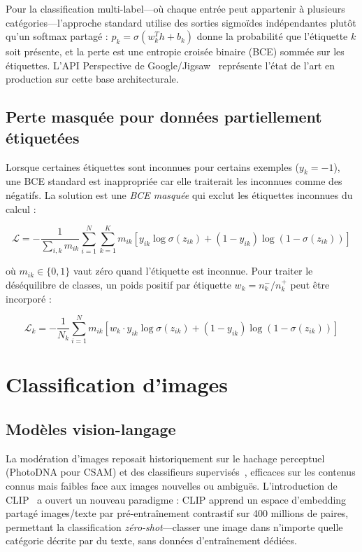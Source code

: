 Pour la classification multi-label---où chaque entrée peut appartenir à plusieurs catégories---l'approche standard utilise des sorties sigmoïdes indépendantes plutôt qu'un softmax partagé : $p_k = \sigma(w_k^T h + b_k)$ donne la probabilité que l'étiquette $k$ soit présente, et la perte est une entropie croisée binaire (BCE) sommée sur les étiquettes. L'API Perspective de Google/Jigsaw~\cite{perspective2023api} représente l'état de l'art en production sur cette base architecturale.

\subsection{Perte masquée pour données partiellement étiquetées}

Lorsque certaines étiquettes sont inconnues pour certains exemples ($y_k = -1$), une BCE standard est inappropriée car elle traiterait les inconnues comme des négatifs. La solution est une \emph{BCE masquée} qui exclut les étiquettes inconnues du calcul :

\begin{equation}
\mathcal{L} = -\frac{1}{\sum_{i,k} m_{ik}} \sum_{i=1}^{N} \sum_{k=1}^{K} m_{ik} \left[ y_{ik} \log \sigma(z_{ik}) + (1 - y_{ik}) \log (1 - \sigma(z_{ik})) \right]
\label{eq:masked_bce}
\end{equation}

où $m_{ik} \in \{0, 1\}$ vaut zéro quand l'étiquette est inconnue. Pour traiter le déséquilibre de classes, un poids positif par étiquette $w_k = n_k^{-} / n_k^{+}$ peut être incorporé :

\begin{equation}
\mathcal{L}_k = -\frac{1}{N_k} \sum_{i=1}^{N} m_{ik} \left[ w_k \cdot y_{ik} \log \sigma(z_{ik}) + (1 - y_{ik}) \log (1 - \sigma(z_{ik})) \right]
\label{eq:weighted_masked_bce}
\end{equation}

\section{Classification d'images}

\subsection{Modèles vision-langage}

La modération d'images reposait historiquement sur le hachage perceptuel (PhotoDNA pour CSAM) et des classifieurs supervisés~\cite{mazur2015hybrid}, efficaces sur les contenus connus mais faibles face aux images nouvelles ou ambiguës. L'introduction de CLIP~\cite{radford2021learning} a ouvert un nouveau paradigme : CLIP apprend un espace d'embedding partagé images/texte par pré-entraînement contrastif sur 400 millions de paires, permettant la classification \emph{zéro-shot}—classer une image dans n'importe quelle catégorie décrite par du texte, sans données d'entraînement dédiées.

